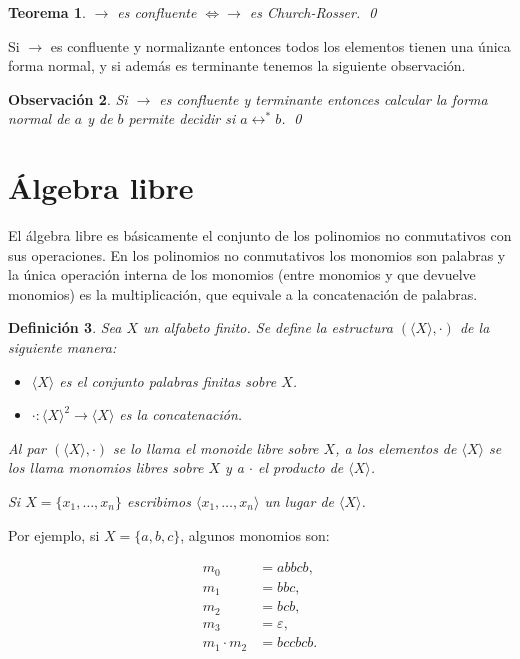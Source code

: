 \documentclass[12pt]{report}
\theoremstyle{customstyle}
\newtheorem{theorem}{Teorema}[chapter]
\newtheorem{definition}[theorem]{Definición}
\newtheorem{observation}[theorem]{Observación}
\theoremstyle{factstyle}
\begin{document}
\begin{theorem}\label{thm:confluente ⇔ Church-Rosser}
  $→$ es confluente $⇔ →$ es Church-Rosser.
  \qed
\end{theorem}

Si $→$ es confluente y normalizante entonces todos los elementos tienen una única forma normal, y si además es terminante tenemos la siguiente observación.

\begin{observation}\label{obs:→ confluente y terminante}
  Si $→$ es confluente y terminante entonces calcular la forma normal de $a$ y de $b$ permite decidir si $a ↔ ^* b$.
  \qed
\end{observation}

\section{Álgebra libre}

El álgebra libre es básicamente el conjunto de los polinomios no conmutativos con sus operaciones. En los polinomios no conmutativos los monomios son palabras y la única operación interna de los monomios (entre monomios y que devuelve monomios) es la multiplicación, que equivale a la concatenación de palabras.

\begin{definition}
  Sea $X$ un alfabeto finito. Se define la estructura $(⟨X⟩, ·)$ de la siguiente manera:
  \begin{itemize}
    \item $⟨X⟩$ es el conjunto palabras finitas sobre $X$.
    \item $· : ⟨X⟩^2 → ⟨X⟩$ es la concatenación.
  \end{itemize}
  Al par $(⟨X⟩, ·)$ se lo llama el monoide libre sobre $X$, a los elementos de $⟨X⟩$ se los llama monomios libres sobre $X$ y a $·$ el producto de $⟨X⟩$.

  Si $X = \{x_1, …, x_n\}$ escribimos $⟨x_1, …, x_n⟩$ un lugar de $⟨X⟩$.
\end{definition}

Por ejemplo, si $X = \{a, b, c\}$, algunos monomios son:

\begin{align*}
  m_0 &= abbcb \text{,} \\
  m_1 &= bbc \text{,} \\
  m_2 &= bcb \text{,} \\
  m_3 &= ε \text{,} \\
  m_1 · m_2 &= bccbcb \text{.}
\end{align*}
\end{document}
